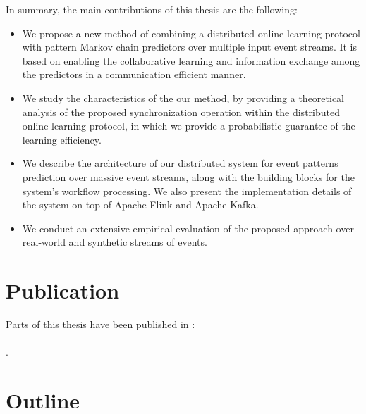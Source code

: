 In summary, the main contributions of this thesis are the following:

\begin{itemize}
	
	\item We propose a new method of combining a distributed online learning protocol with pattern Markov chain predictors over multiple input event streams. It is based on enabling the collaborative learning and information exchange among the predictors in a communication efficient manner.  
	
	\item We study the characteristics of the our method, by providing a theoretical analysis of the proposed synchronization operation within the distributed online learning protocol, in which we provide a probabilistic guarantee of the learning efficiency. 
	
	\item We describe the architecture of our distributed system for event patterns prediction over massive event streams, along with the building blocks for the system's workflow processing. We also present the implementation details of  the system on top of Apache Flink and Apache Kafka. 
	
	\item We conduct an extensive empirical evaluation of the proposed approach over real-world and synthetic streams of events.
  
\end{itemize}


\section{Publication}

Parts of this thesis have been published in \cite{Qadah}:\\ \\
.

\section{Outline }

	
